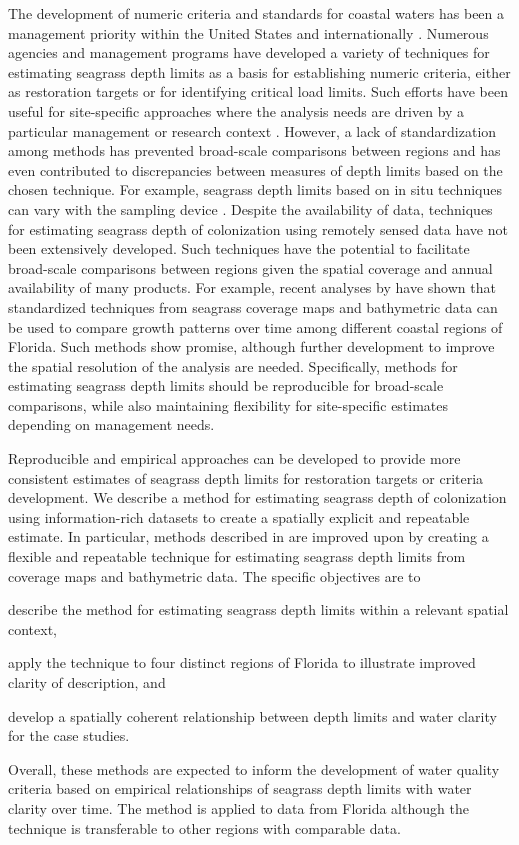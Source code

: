\documentclass[letterpaper,12pt,oneside]{article}\usepackage[]{graphicx}\usepackage[]{color}
\begin{document}
The development of numeric criteria and standards for coastal waters has been a management priority within the United States \citep{USEPA98} and internationally \citep{WFD00}.  Numerous agencies and management programs have developed a variety of techniques for estimating seagrass depth limits as a basis for establishing numeric criteria, either as restoration targets or for identifying critical load limits.  Such efforts have been useful for site-specific approaches where the analysis needs are driven by a particular management or research context \citep[e.g.,][]{Iverson86,Hale04}. However, a lack of standardization among methods has prevented broad-scale comparisons between regions and has even contributed to discrepancies between measures of depth limits based on the chosen technique.  For example, seagrass depth limits based on in situ techniques can vary with the sampling device \citep{Spears09}.  Despite the availability of data, techniques for estimating seagrass depth of colonization using remotely sensed data have not been extensively developed.  Such techniques have the potential to facilitate broad-scale comparisons between regions given the spatial coverage and annual availability of many products.  For example, recent analyses by  have shown that standardized techniques from seagrass coverage maps and bathymetric data can be used to compare growth patterns over time among different coastal regions of Florida.  Such methods show promise, although further development to improve the spatial resolution of the analysis are needed.  Specifically, methods for estimating seagrass depth limits should be reproducible for broad-scale comparisons, while also maintaining flexibility for site-specific estimates depending on management needs.

Reproducible and empirical approaches can be developed to provide more consistent estimates of seagrass depth limits for restoration targets or criteria development. We describe a method for estimating seagrass depth of colonization using information-rich datasets to create a spatially explicit and repeatable estimate.  In particular, methods described in  are improved upon by creating a flexible and repeatable technique for estimating seagrass depth limits from coverage maps and bathymetric data. The specific objectives are to\begin{inparaenum}[1\upshape)]
\item describe the method for estimating seagrass depth limits within a relevant spatial context, 
\item apply the technique to four distinct regions of Florida to illustrate improved clarity of description, and
\item develop a spatially coherent relationship between depth limits and water clarity for the case studies.  
\end{inparaenum}
Overall, these methods are expected to inform the development of water quality criteria based on empirical relationships of seagrass depth limits with water clarity over time.  The method is applied to data from Florida although the technique is transferable to other regions with comparable data. 
\end{document}
